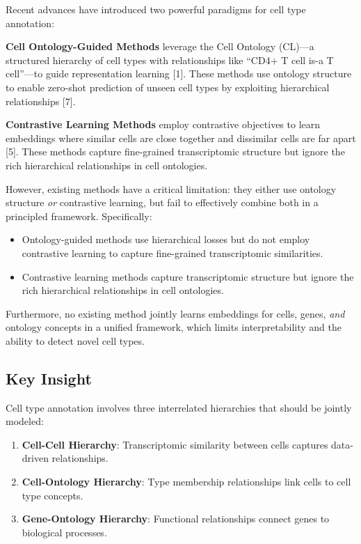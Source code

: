 \documentclass[11pt]{article}
\begin{document}
Recent advances have introduced two powerful paradigms for cell type annotation:

\textbf{Cell Ontology-Guided Methods} leverage the Cell Ontology (CL)---a structured hierarchy of cell types with relationships like ``CD4+ T cell is-a T cell''---to guide representation learning [1]. These methods use ontology structure to enable zero-shot prediction of unseen cell types by exploiting hierarchical relationships [7].

\textbf{Contrastive Learning Methods} employ contrastive objectives to learn embeddings where similar cells are close together and dissimilar cells are far apart [5]. These methods capture fine-grained transcriptomic structure but ignore the rich hierarchical relationships in cell ontologies.

However, existing methods have a critical limitation: they either use ontology structure \textit{or} contrastive learning, but fail to effectively combine both in a principled framework. Specifically:
\begin{itemize}
    \item Ontology-guided methods use hierarchical losses but do not employ contrastive learning to capture fine-grained transcriptomic similarities.
    \item Contrastive learning methods capture transcriptomic structure but ignore the rich hierarchical relationships in cell ontologies.
\end{itemize}

Furthermore, no existing method jointly learns embeddings for cells, genes, \textit{and} ontology concepts in a unified framework, which limits interpretability and the ability to detect novel cell types.

\subsection{Key Insight}

Cell type annotation involves three interrelated hierarchies that should be jointly modeled:
\begin{enumerate}
    \item \textbf{Cell-Cell Hierarchy}: Transcriptomic similarity between cells captures data-driven relationships.
    \item \textbf{Cell-Ontology Hierarchy}: Type membership relationships link cells to cell type concepts.
    \item \textbf{Gene-Ontology Hierarchy}: Functional relationships connect genes to biological processes.
\end{enumerate}
\end{document}
